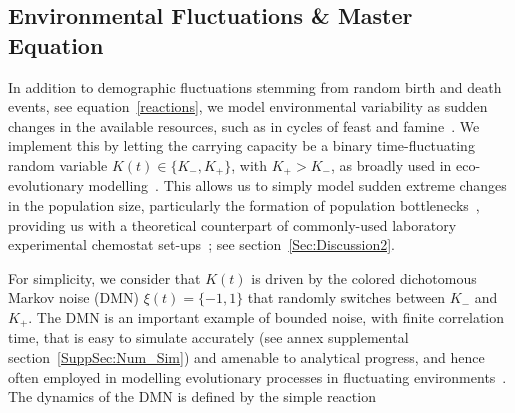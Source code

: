 \documentclass{article}
\begin{document}
\subsection{Environmental Fluctuations \& Master Equation}\label{Sec:EnvStat} 
In addition to  demographic fluctuations stemming from random birth and death events, see equation~\eqref{reactions}, we model environmental variability as sudden changes in the available resources, such as in cycles of feast and famine~\cite{Srinivasan98, bernhardt2018metabolic, Merritt18, Himeoka19}. We implement this by letting the carrying capacity be a binary time-fluctuating random variable $K(t)\in\{K_-,K_+\}$, with $K_+>K_-$, as broadly used in eco-evolutionary modelling~\cite{thattai2004stochastic, Bena2006, HL06, hufton2016intrinsic, hidalgo2017species, wienand2017evolution, marrec2020resist, west2020, taitelbaum2020population, Shibasaki2021, taitelbaum2023evolutionary}. This allows us to simply model sudden extreme changes in the population size, particularly the formation of population bottlenecks~\cite{Wahl02, Patwas09, Brockhurst07, Brockhurst07b,Lambert2014,wienand2017evolution}, providing us with a theoretical counterpart of commonly-used laboratory experimental chemostat set-ups~\cite{acar2008, Lambert2014,abdul2021fluctuating, nguyen2021}; see section~\ref{Sec:Discussion2}.

For simplicity, we consider that $K(t)$ is driven by the colored dichotomous Markov noise (DMN) $\xi(t)=\{-1,1\}$ that randomly switches between $K_-$ and $K_+$. The DMN is an important  example of bounded  noise, with finite correlation time, that is easy to simulate accurately (see annex supplemental section~\ref{SuppSec:Num_Sim}) and amenable to analytical progress, and hence often employed in modelling evolutionary processes in fluctuating environments~\cite{Bena2006,HL06,Ridolfi11,hufton2016intrinsic,wienand2017evolution,wienand2018eco,west2020,Shibasaki2021,taitelbaum2020population}. The dynamics of the DMN is defined by the simple reaction~\cite{Bena2006,HL06,Ridolfi11} 
\end{document}
